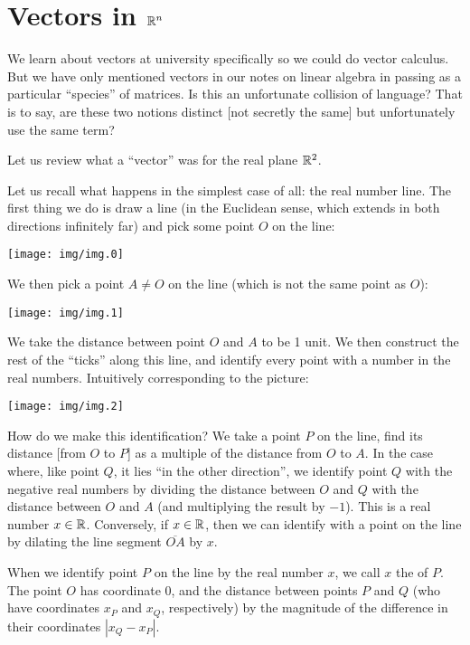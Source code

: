 \section{Vectors in \texorpdfstring{$\mathbb{R}^{n}$}{Rn}}\label{section:vectors-in-r-n}

\M
We learn about vectors at university specifically so we could do vector
calculus. But we have only mentioned vectors in our notes on linear
algebra in passing as a particular ``species'' of matrices. Is this an
unfortunate collision of language? That is to say, are these two notions
distinct [not secretly the same] but unfortunately use the same term?

Let us review what a ``vector'' was for the real plane $\mathbb{R}^{2}$.

Let us recall what happens in the simplest case of all: the real number
line. The first thing we do is draw a line (in the Euclidean sense,
which extends in both directions infinitely far) and pick some point $O$
on the line:
\begin{center}
  \texttt{[image: img/img.0]}
\end{center}
We then pick a point $A\neq O$ on the line (which is not the same point
as $O$):
\begin{center}
  \texttt{[image: img/img.1]}
\end{center}
We take the distance between point $O$ and $A$ to be 1 unit. We then
construct the rest of the ``ticks'' along this line, and identify every
point with a number in the real numbers. Intuitively corresponding to
the picture:
\begin{center}
  \texttt{[image: img/img.2]}
\end{center}
How do we make this identification? We take a point $P$ on the line,
find its distance [from $O$ to $P$] as a multiple of the distance from
$O$ to $A$. In the case where, like point $Q$, it lies ``in the other
direction'', we identify point $Q$ with the negative real numbers by
dividing the distance between $O$ and $Q$ with the distance between $O$
and $A$ (and multiplying the result by $-1$). This is a real number
$x\in\mathbb{R}$. Conversely, if $x\in\mathbb{R}$, then we can identify with a point
on the line by dilating the line segment $\overline{OA}$ by $x$.

When we identify point $P$ on the line by the real number $x$, we call
$x$ the  of $P$. The point $O$ has coordinate $0$,
and the distance between points $P$ and $Q$ (who have coordinates
$x_{P}$ and $x_{Q}$, respectively) by the magnitude of the difference in
their coordinates $|x_{Q}-x_{P}|$.

